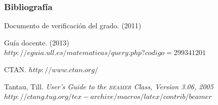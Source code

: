\documentclass{beamer}
\newcommand{\beamer}{\textsc{beamer}}
\begin{document}
\begin{frame}
  \frametitle{Bibliografía}

  \begin{thebibliography}{10}

    \beamertemplatebookbibitems
    Documento de verificación del grado. 
    (2011) 

    \beamertemplatebookbibitems
    Guía docente. 
    (2013) 
    {\small $http://eguia.ull.es/matematicas/query.php?codigo=299341201$}

    \beamertemplatebookbibitems
    CTAN. {\small $http://www.ctan.org/$}

    \beamertemplatebookbibitems
    Tantau, Till. 
    \emph{User's Guide to the \beamer{} Class, Version 3.06, 2005} 
    {\small $http://ctang.tug.org/tex-archive/macros/latex/contrib/beamer$}


  \end{thebibliography}
\end{frame}


\end{document}
